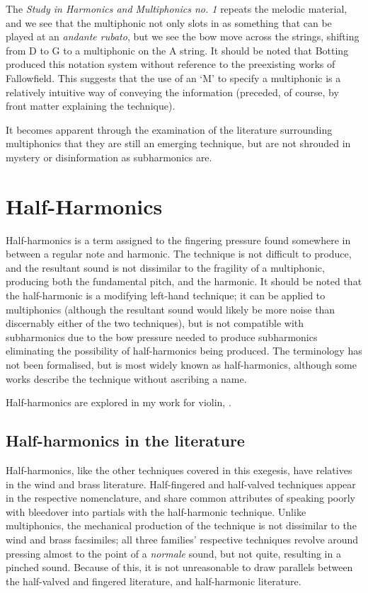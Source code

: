 The \emph{Study in Harmonics and Multiphonics no. 1} repeats the melodic material, and we see that the multiphonic not only slots in as something that can be played at an \emph{andante rubato}, but we see the bow move across the strings, shifting from D to G to a multiphonic on the A string.
It should be noted that Botting produced this notation system without reference to the preexisting works of Fallowfield.
This suggests that the use of an `M' to specify a multiphonic is a relatively intuitive way of conveying the information (preceded, of course, by front matter explaining the technique).

It becomes apparent through the examination of the literature surrounding multiphonics that they are still an emerging technique, but are not shrouded in mystery or disinformation as subharmonics are.

\newpage
\section{Half-Harmonics}\label{sec:halfHarmonicsDiscussion}
Half-harmonics is a term assigned to the fingering pressure found somewhere in between a regular note and harmonic. 
The technique is not difficult to produce, and the resultant sound is not dissimilar to the fragility of a multiphonic, producing both the fundamental pitch, and the harmonic. 
It should be noted that the half-harmonic is a modifying left-hand technique; it can be applied to multiphonics (although the resultant sound would likely be more noise than discernably either of the two techniques), but is not compatible with subharmonics due to the bow pressure needed to produce subharmonics eliminating the possibility of half-harmonics being produced.
The terminology has not been formalised, but is most widely known as half-harmonics, although some works describe the technique without ascribing a name.

Half-harmonics are explored in my work for violin, .

\subsection{Half-harmonics in the literature}
Half-harmonics, like the other techniques covered in this exegesis, have relatives in the wind and brass literature. 
Half-fingered and half-valved techniques appear in the respective nomenclature, and share common attributes of speaking poorly with bleedover into partials with the half-harmonic technique.
Unlike multiphonics, the mechanical production of the technique is not dissimilar to the wind and brass facsimiles; all three families' respective techniques revolve around pressing almost to the point of a \emph{normale} sound, but not quite, resulting in a pinched sound.
Because of this, it is not unreasonable to draw parallels between the half-valved and fingered literature, and half-harmonic literature. 

